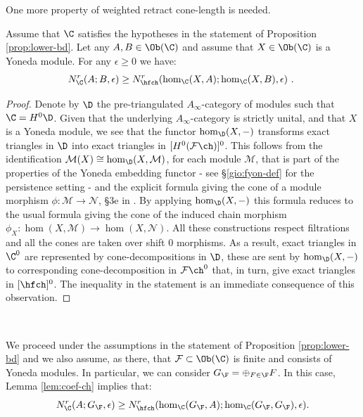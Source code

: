 One more property of weighted retract cone-length is needed.
\begin{lem}\label{lem:coef-ch} Assume that $\C$ satisfies the
  hypotheses in the statement of Proposition \ref{prop:lower-bd}. Let
  any $A, B\in\Ob(\C)$ and assume that $X\in \Ob(\C)$ is a Yoneda
  module. For any $\epsilon\geq 0$ we have:
  $$N^{r}_{\C}(A;B,\epsilon) \geq
  N^{r}_{\hfch}(\hom_{\C}(X,A);\hom_{\C}(X,B), \epsilon)~.~$$
\end{lem}

\begin{proof} Denote by $\D$ the pre-triangulated
  $A_{\infty}$-category of modules such that $\C=H^0\D$. Given
  that the underlying $A_{\infty}$-category is strictly unital, and
  that $X$ is a Yoneda module, we see that the functor
  $\hom_{\D}(X, -)$ transforms exact triangles in $\D$ into exact
  triangles in $[H^0(\mathcal{F}\ch)]^0$. This follows from
  the identification $\mathcal{M}(X)\cong \hom_{\D}(X,\mathcal{M})$,
  for each module $\mathcal{M}$, that is part of the properties of the
  Yoneda embedding functor - see \S\ref{gio:fyon-def} for the
  persistence setting - and the explicit formula giving the cone of a
  module morphism $\phi:\mathcal{M}\to \mathcal{N}$, \S3e in
  \cite{Se:book-fukaya-categ}. By applying $\hom_{\D}(X,-)$ this
  formula reduces to the usual formula giving the cone of the induced
  chain morphism
  $\phi_{X}:\hom(X,\mathcal{M})\to\hom(X,\mathcal{N})$. All these
  constructions respect filtrations and all the cones are taken over
  shift $0$ morphisms. As a result, exact triangles in $\C^{0}$ are
  represented by cone-decompositions in $\D$, these are sent by
  $\hom_{\D}(X,-)$ to corresponding cone-decomposition in
  $\mathcal{F}\ch^0$ that, in turn, give exact triangles in
  $[\hfch]^{0}$. The inequality in the statement is an immediate
  consequence of this observation.
\end{proof}

\

We proceed under the assumptions in the statement of Proposition
\ref{prop:lower-bd} and we also assume, as there, that
$\mathcal{F}\subset \Ob (\C)$ is finite and consists of Yoneda
modules. In particular, we can consider $G_{\F}=\oplus_{F\in\F}F$. In
this case, Lemma \ref{lem:coef-ch} implies that:
\begin{equation} \label{eq:NrC-GF}
  N^{r}_{\C}(A; G_{\F},\epsilon)\geq
  N^{r}_{\hfch}(\hom_{\C}(G_{\F}, A);
  \hom_{\C}(G_{\F},G_{\F}),\epsilon).
\end{equation}

